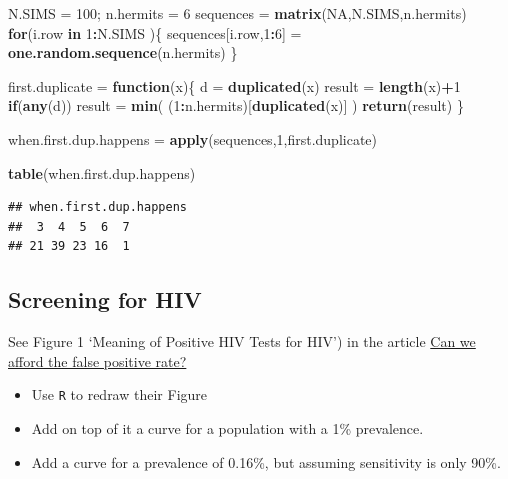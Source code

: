 \documentclass[]{book}
\newenvironment{Shaded}{\begin{snugshade}}{\end{snugshade}}
\newcommand{\ControlFlowTok}[1]{\textcolor[rgb]{0.13,0.29,0.53}{\textbf{#1}}}
\newcommand{\DecValTok}[1]{\textcolor[rgb]{0.00,0.00,0.81}{#1}}
\newcommand{\KeywordTok}[1]{\textcolor[rgb]{0.13,0.29,0.53}{\textbf{#1}}}
\newcommand{\NormalTok}[1]{#1}
\newcommand{\OperatorTok}[1]{\textcolor[rgb]{0.81,0.36,0.00}{\textbf{#1}}}
\newcommand{\OtherTok}[1]{\textcolor[rgb]{0.56,0.35,0.01}{#1}}
\newcommand{\StringTok}[1]{\textcolor[rgb]{0.31,0.60,0.02}{#1}}
\begin{document}
\begin{Shaded}
\begin{Highlighting}[]
\NormalTok{N.SIMS =}\StringTok{ }\DecValTok{100}\NormalTok{; n.hermits =}\StringTok{ }\DecValTok{6}
\NormalTok{sequences  =}\StringTok{ }\KeywordTok{matrix}\NormalTok{(}\OtherTok{NA}\NormalTok{,N.SIMS,n.hermits)}
\ControlFlowTok{for}\NormalTok{(i.row }\ControlFlowTok{in} \DecValTok{1}\OperatorTok{:}\NormalTok{N.SIMS )\{}
\NormalTok{   sequences[i.row,}\DecValTok{1}\OperatorTok{:}\DecValTok{6}\NormalTok{] =}\StringTok{ }\KeywordTok{one.random.sequence}\NormalTok{(n.hermits)}
\NormalTok{\}}

\NormalTok{first.duplicate =}\StringTok{ }\ControlFlowTok{function}\NormalTok{(x)\{}
\NormalTok{   d =}\StringTok{ }\KeywordTok{duplicated}\NormalTok{(x)}
\NormalTok{   result =}\StringTok{ }\KeywordTok{length}\NormalTok{(x)}\OperatorTok{+}\DecValTok{1} 
   \ControlFlowTok{if}\NormalTok{(}\KeywordTok{any}\NormalTok{(d)) result =}\StringTok{ }\KeywordTok{min}\NormalTok{( (}\DecValTok{1}\OperatorTok{:}\NormalTok{n.hermits)[}\KeywordTok{duplicated}\NormalTok{(x)] )}
   \KeywordTok{return}\NormalTok{(result)}
\NormalTok{\} }

\NormalTok{when.first.dup.happens =}\StringTok{ }\KeywordTok{apply}\NormalTok{(sequences,}\DecValTok{1}\NormalTok{,first.duplicate)}

\KeywordTok{table}\NormalTok{(when.first.dup.happens)}
\end{Highlighting}
\end{Shaded}

\begin{verbatim}
## when.first.dup.happens
##  3  4  5  6  7 
## 21 39 23 16  1
\end{verbatim}

\hypertarget{screening-for-hiv}{%
\subsection{Screening for HIV}\label{screening-for-hiv}}

See Figure 1 `Meaning of Positive HIV Tests for HIV') in the article \href{http://www.medicine.mcgill.ca/epidemiology/hanley/bios601/CandH-ch0102/MeyerPaukerHIVscreening.pdf}{Can we afford the false
positive rate?}

\begin{itemize}
\item
  Use \texttt{R} to redraw their Figure
\item
  Add on top of it a curve for a population with a 1\% prevalence.
\item
  Add a curve for a prevalence of 0.16\%, but assuming sensitivity is only 90\%.
\end{itemize}
\end{document}
